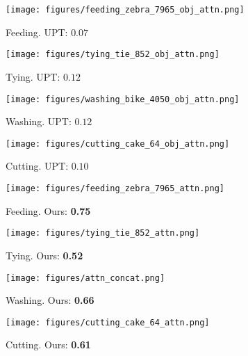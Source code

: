 \documentclass[10pt,twocolumn,letterpaper]{article}
\begin{document}
\begin{figure*}[t]\captionsetup[subfigure]{font=footnotesize}
   \begin{subfigure}[t]{0.245\linewidth}
     \centering
     \texttt{[image: figures/feeding\_zebra\_7965\_obj\_attn.png]}
     \caption{Feeding. UPT: $0.07$}
     \label{fig:comp_1}
   \end{subfigure}\hfill
   \begin{subfigure}[t]{0.245\linewidth}
     \centering
     \texttt{[image: figures/tying\_tie\_852\_obj\_attn.png]}
     \caption{Tying. UPT: $0.12$}
     \label{fig:comp_3}
   \end{subfigure}\hfill
   \begin{subfigure}[t]{0.245\linewidth}
     \centering
     \texttt{[image: figures/washing\_bike\_4050\_obj\_attn.png]}
     \caption{Washing. UPT: $0.12$}
     \label{fig:comp_2}
   \end{subfigure}\hfill
   \begin{subfigure}[t]{0.245\linewidth}
     \centering
     \texttt{[image: figures/cutting\_cake\_64\_obj\_attn.png]}
     \caption{Cutting. UPT: $0.10$}
     \label{fig:comp_4}
   \end{subfigure}\vfill \begin{subfigure}[t]{0.245\linewidth}
      \centering
      \texttt{[image: figures/feeding\_zebra\_7965\_attn.png]}
      \caption{Feeding. Ours: \textbf{0.75}}
      \label{fig:comp_1_ours}
   \end{subfigure}\hfill
   \begin{subfigure}[t]{0.245\linewidth}
      \texttt{[image: figures/tying\_tie\_852\_attn.png]}
      \caption{Tying. Ours: \textbf{0.52}}
      \label{fig:comp_3_ours}
   \end{subfigure}\hfill
   \begin{subfigure}[t]{0.245\linewidth}
      \centering
      \texttt{[image: figures/attn\_concat.png]}
      \caption{Washing. Ours: \textbf{0.66}}
      \label{fig:comp_2_ours}
   \end{subfigure}\hfill
   \begin{subfigure}[t]{0.245\linewidth}
      \texttt{[image: figures/cutting\_cake\_64\_attn.png]}
      \caption{Cutting. Ours: \textbf{0.61}}
      \label{fig:comp_4_ours}
   \end{subfigure}\vfill \begin{subfigure}[t]{0.245\linewidth}
      \centering

\end{subfigure}
\end{figure*}
\end{document}
